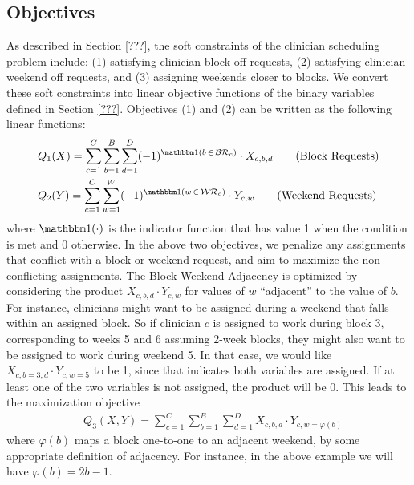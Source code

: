 \subsection{Objectives}
As described in Section \ref{???}, the soft constraints of the clinician scheduling problem include: (1) satisfying clinician block off requests, (2) satisfying clinician weekend off requests, and (3) assigning weekends closer to blocks. We convert these soft constraints into linear objective functions of the binary variables defined in Section \ref{???}. Objectives (1) and (2) can be written as the following linear functions:  %
\begin{align}
	&Q_1(X) = \sum_{c=1}^{C} \sum_{b=1}^{B} \sum_{d=1}^{D} (-1)^{\ind(b\,\in\,\mathcal{BR}_c)}\cdot X_{c, b, d} \tag{Block Requests} \label{eqn:obj-block-requests}\\
	&Q_2(Y) = \sum_{c=1}^{C} \sum_{w=1}^{W} (-1)^{\ind(w\,\in\,\mathcal{WR}_c)}\cdot Y_{c, w} \tag{Weekend Requests} \label{eqn:obj-weekend-requests}
\end{align}
where $\ind(\cdot)$ is the indicator function that has value 1 when the condition is met and 0 otherwise. In the above two objectives, we penalize any assignments that conflict with a block or weekend request, and aim to maximize the non-conflicting assignments. The Block-Weekend Adjacency is optimized by considering the product $X_{c, b, d}\cdot Y_{c, w}$ for values of $w$ ``adjacent'' to the value of $b$. For instance, clinicians might want to be assigned during a weekend that falls within an assigned block. So if clinician $c$ is assigned to work during block 3, corresponding to weeks 5 and 6 assuming 2-week blocks, they might also want to be assigned to work during weekend 5. In that case, we would like $X_{c, b=3, d} \cdot Y_{c, w=5}$ to be 1, since that indicates both variables are assigned. If at least one of the two variables is not assigned, the product will be 0. This leads to the maximization objective  %
\begin{align}
	&Q_3(X, Y) = \sum_{c=1}^{C} \sum_{b=1}^{B} \sum_{d=1}^{D} X_{c, b, d}\cdot Y_{c, w=\varphi(b)} \tag{Block-Weekend Adjacency} \label{eqn:obj-block-weekend-adj}
\end{align}
where $\varphi(b)$ maps a block one-to-one to an adjacent weekend, by some appropriate definition of adjacency. For instance, in the above example we will have $\varphi(b) = 2b - 1$. \\

